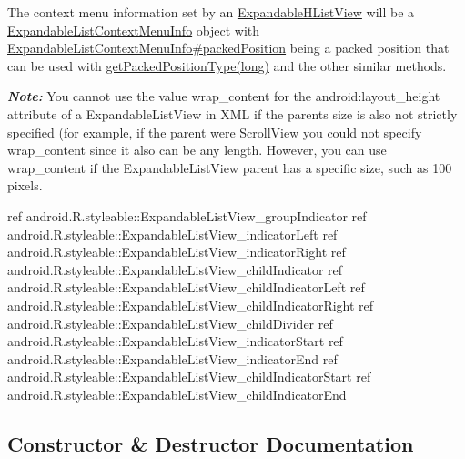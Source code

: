 The context menu information set by an \hyperlink{classit_1_1sephiroth_1_1android_1_1library_1_1widget_1_1_expandable_h_list_view}{Expandable\+H\+List\+View} will be a \hyperlink{}{Expandable\+List\+Context\+Menu\+Info} object with \hyperlink{}{Expandable\+List\+Context\+Menu\+Info\#packed\+Position} being a packed position that can be used with \hyperlink{classit_1_1sephiroth_1_1android_1_1library_1_1widget_1_1_expandable_h_list_view_ae574c6efbf83f1bb3d588c13a7bd0ef1}{get\+Packed\+Position\+Type(long)} and the other similar methods. 

{\itshape {\bfseries Note\+:}} You cannot use the value {\ttfamily wrap\+\_\+content} for the {\ttfamily android\+:layout\+\_\+height} attribute of a Expandable\+List\+View in X\+ML if the parent\textquotesingle{}s size is also not strictly specified (for example, if the parent were Scroll\+View you could not specify wrap\+\_\+content since it also can be any length. However, you can use wrap\+\_\+content if the Expandable\+List\+View parent has a specific size, such as 100 pixels.

ref android.\+R.\+styleable\+::\+Expandable\+List\+View\+\_\+group\+Indicator  ref android.\+R.\+styleable\+::\+Expandable\+List\+View\+\_\+indicator\+Left  ref android.\+R.\+styleable\+::\+Expandable\+List\+View\+\_\+indicator\+Right  ref android.\+R.\+styleable\+::\+Expandable\+List\+View\+\_\+child\+Indicator  ref android.\+R.\+styleable\+::\+Expandable\+List\+View\+\_\+child\+Indicator\+Left  ref android.\+R.\+styleable\+::\+Expandable\+List\+View\+\_\+child\+Indicator\+Right  ref android.\+R.\+styleable\+::\+Expandable\+List\+View\+\_\+child\+Divider  ref android.\+R.\+styleable\+::\+Expandable\+List\+View\+\_\+indicator\+Start  ref android.\+R.\+styleable\+::\+Expandable\+List\+View\+\_\+indicator\+End  ref android.\+R.\+styleable\+::\+Expandable\+List\+View\+\_\+child\+Indicator\+Start  ref android.\+R.\+styleable\+::\+Expandable\+List\+View\+\_\+child\+Indicator\+End 

\subsection{Constructor \& Destructor Documentation}
\mbox{\label{classit_1_1sephiroth_1_1android_1_1library_1_1widget_1_1_expandable_h_list_view_a171f292383e1987f1f09635582677f49}} 
